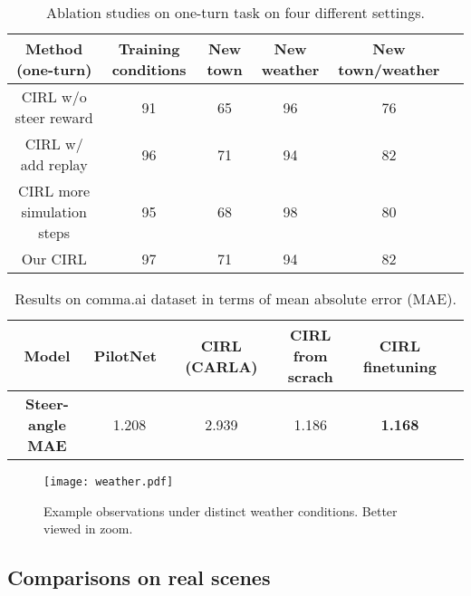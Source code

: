 \documentclass[runningheads]{llncs}
\begin{document}
\begin{table}[t]
\centering
\caption{Ablation studies on one-turn task on four different settings.}\footnotesize\vspace{-3mm}
\begin{tabular}{c|c|c|c|cc}
\toprule[1pt]
   Method (one-turn) & Training conditions & New town & New weather & New town/weather\\ \hline 
   CIRL w/o steer reward  & 91         & 65 & 96 & 76  \\
   CIRL w/ add replay & 96  & 71 & 94 & 82\\
   CIRL more simulation steps & 95  & 68 & 98 & 80\\
   \hline{Our CIRL} & {97}  & {71} & {94} & {82}\\
\toprule[0.7pt]
\end{tabular}\vspace{-4mm}
\label{tab: ablation}
\end{table}

\begin{table}[t]
\centering
\caption{Results on comma.ai dataset in terms of mean absolute error (MAE).}\label{tab:realscene}\footnotesize\vspace{-3mm}
\begin{tabular}{c|c|c|c|cc}
\toprule
\textbf{Model} & PilotNet~\cite{bojarski2016end} & CIRL (CARLA) & CIRL from scrach & CIRL finetuning & \\ \hline
\textbf{Steer-angle MAE}   & 1.208  & 2.939  & 1.186 & \textbf{1.168} \\
\bottomrule
\end{tabular}\vspace{-4mm}
\end{table}

\begin{figure*}[!tp]
        \begin{center}
     \texttt{[image: weather.pdf]}\vspace{-3mm}
            \caption{Example observations under distinct weather conditions. Better viewed in zoom.}\vspace{-10mm}
            \label{fig:weather}
        \end{center}
    \end{figure*}


\subsection{Comparisons on real scenes}
\end{document}
